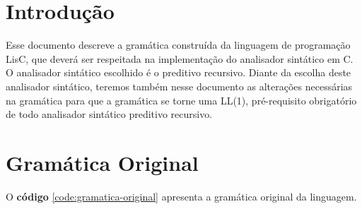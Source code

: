 \documentclass[
  12pt,				%
  oneside,			%
  a4paper,			%
  english,			%
  french,				%
  spanish,			%
  brazil,				%
]{abntex2}
\begin{document}
\frenchspacing 



\imprimirfolhaderosto*


\tableofcontents*

\textual
\chapter{Introdução}
\label{cha:intro}
Esse documento descreve a gramática construída da linguagem de
programação LisC, que deverá ser respeitada na implementação do
analisador sintático em C. O analisador sintático escolhido é o
preditivo recursivo. Diante da escolha deste analisador sintático,
teremos também nesse documento as alterações necessárias na gramática
para que a gramática se torne uma LL(1), pré-requisito obrigatório de
todo analisador sintático preditivo recursivo.


\chapter{Gramática Original}
\label{cha:gramatica-original}
O \textbf{código} \ref{code:gramatica-original} apresenta a gramática
original da linguagem.
\end{document}
